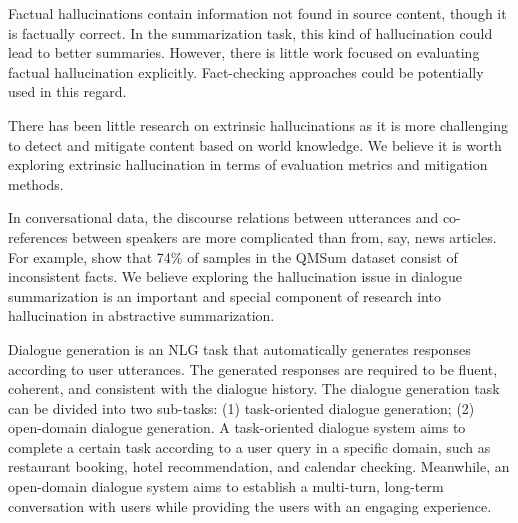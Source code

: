Factual hallucinations contain information not found in source content, though it is factually correct. In the summarization task, this kind of hallucination could lead to better summaries. However, there is little work focused on evaluating factual hallucination explicitly. Fact-checking approaches could be potentially used in this regard.

There has been little research on extrinsic hallucinations as it is more challenging to detect and mitigate content based on world knowledge. We believe it is worth exploring extrinsic hallucination in terms of evaluation metrics and mitigation methods.

In conversational data, the discourse relations between utterances and co-references between speakers are more complicated than from, say, news articles. For example,  show that 74\% of samples in the QMSum dataset consist of inconsistent facts. We believe exploring the hallucination issue in dialogue summarization is an important and special component of research into hallucination in abstractive summarization.

\label{section:dialogue}
Dialogue generation is an NLG task that automatically generates responses according to user utterances. The generated responses are required to be fluent, coherent, and consistent with the dialogue history. The dialogue generation task can be divided into two sub-tasks: (1) task-oriented dialogue generation; (2) open-domain dialogue generation. A task-oriented dialogue system aims to complete a certain task according to a user query in a specific domain, such as restaurant booking, hotel recommendation, and calendar checking. Meanwhile, an open-domain dialogue system aims to establish a multi-turn, long-term conversation with users while providing the users with an engaging experience.

